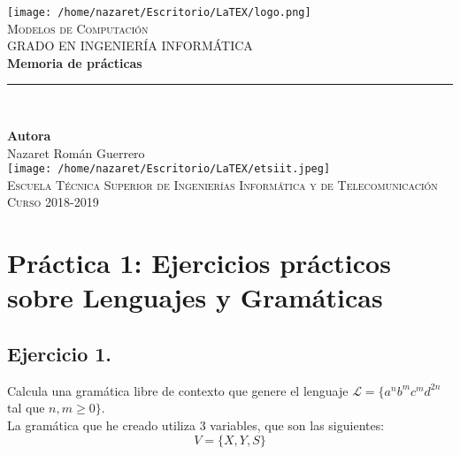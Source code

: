 \documentclass[11pt,a4paper]{article}
\begin{document}
\begin{titlepage}

\begin{minipage}{\textwidth}

\centering
\texttt{[image: /home/nazaret/Escritorio/LaTEX/logo.png]}\\

\textsc{\Large Modelos de Computación\\[0.2cm]}
\textsc{GRADO EN INGENIERÍA INFORMÁTICA}\\[1cm]

{\Huge\bfseries Memoria de prácticas\\}
\noindent\rule[-1ex]{\textwidth}{3pt}\\[3.5ex]
{\large\bfseries}
\end{minipage}

\vspace{1.5cm}
\begin{minipage}{\textwidth}
\centering

\textbf{Autora}\\ {Nazaret Román Guerrero}\\[2.5ex]
\texttt{[image: /home/nazaret/Escritorio/LaTEX/etsiit.jpeg]}\\[0.1cm]
\vspace{1cm}
\textsc{Escuela Técnica Superior de Ingenierías Informática y de Telecomunicación}\\
\vspace{1cm}
\textsc{Curso 2018-2019}
\end{minipage}
\end{titlepage}

\tableofcontents
\thispagestyle{empty}

\newpage

\section{Práctica 1: Ejercicios prácticos sobre Lenguajes y Gramáticas}
\subsection{Ejercicio 1.} Calcula una gramática libre de contexto que genere el lenguaje $\mathcal{L}=\{a^nb^mc^md^{2n}$ tal que $n,m\geq 0\}$.\\

La gramática que he creado utiliza 3 variables, que son las siguientes:
	\[V=\{X,Y,S\}\]
	
\end{document}
